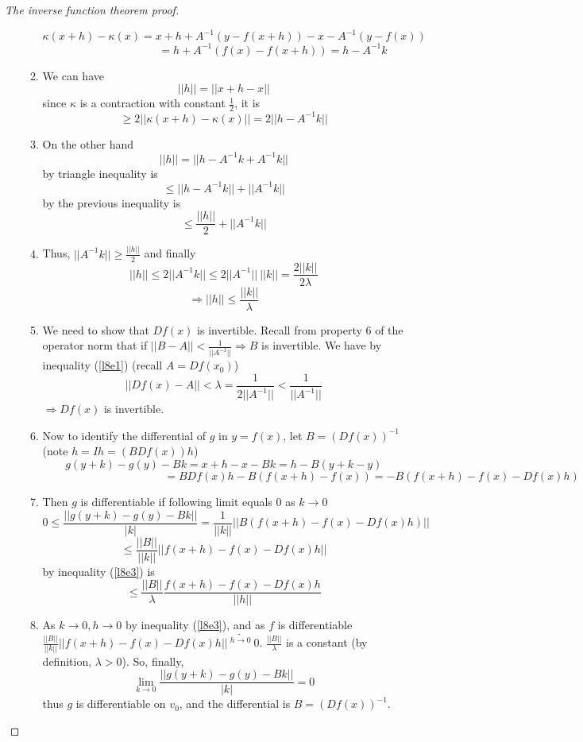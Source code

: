 \begin{proof}[The inverse function theorem proof]
\begin{enumerate}[I]
\begin{enumerate}
      $$\kappa(x+h) - \kappa(x) = x + h + A^{-1}(y-f(x+h))-x-A^{-1}(y-f(x))$$
      $$\phantom{\kappa(x+h) - \kappa(x)} =h+A^{-1}(f(x)-f(x+h))=h-A^{-1}k$$
    \item We can have
      $$||h|| = ||x + h - x||$$
      since $\kappa$ is a contraction with constant $\frac{1}{2}$, it is
      $$\geq 2||\kappa(x+h)-\kappa(x)|| = 2||h-A^{-1}k||$$
    \item On the other hand
      $$||h|| = ||h-A^{-1}k + A^{-1}k||$$
      by triangle inequality is
      $$\leq ||h-A^{-1}k|| + ||A^{-1}k||$$
      by the previous inequality is
      $$\leq \frac{||h||}{2}+||A^{-1}k||$$
    \item Thus, $||A^{-1}k|| \geq \frac{||h||}{2}$ and finally
      $$||h|| \leq 2||A^{-1}k|| \leq 2||A^{-1}||\ ||k|| = \frac{2||k||}{2\lambda}$$
      \begin{equation}
        \label{l8e3}
        \Rightarrow ||h|| \leq \frac{||k||}{\lambda}
      \end{equation}
    \item We need to show that $Df(x)$ is invertible. Recall from property 6 of the operator norm that if $||B - A|| < \frac{1}{||A^{-1}||} \Rightarrow B$ is invertible. We have by inequality (\ref{l8e1}) (recall $A = Df(x_0)$)
      $$||Df(x) - A|| < \lambda = \frac{1}{2||A^{-1}||} < \frac{1}{||A^{-1}||}$$
      $\Rightarrow Df(x)$ is invertible.
    \item Now to identify the differential of $g$ in $y=f(x)$, let $B=(Df(x))^{-1}$ (note $h = Ih = (BDf(x))h$)
      $$g(y+k) - g(y) - Bk = x+h-x-Bk = h-B(y+k-y)$$
      $$\phantom{g(y+k) - g(y) - Bk}= BDf(x)h - B(f(x+h) - f(x)) = -B(f(x+h)-f(x)-Df(x)h)$$
    \item Then $g$ is differentiable if following limit equals $0$ as $k \rightarrow 0$
      $$0 \leq \frac{||g(y+k) - g(y) - Bk||}{|k|} = \frac{1}{||k||}||B(f(x+h)-f(x)-Df(x)h)|| $$
      $$\leq \frac{||B||}{||k||}||f(x+h)-f(x)-Df(x)h||$$
      by inequality (\ref{l8e3}) is
      $$\leq \frac{||B||}{\lambda}\frac{f(x+h)-f(x)-Df(x)h}{||h||}$$
    \item As $k\rightarrow 0, h\rightarrow 0$ by inequality (\ref{l8e3}), and as $f$ is differentiable $\frac{||B||}{||k||}||f(x+h)-f(x)-Df(x)h||\ \underrightarrow{^{h\rightarrow 0}}\ 0$. $\frac{||B||}{\lambda}$ is a constant (by definition, $\lambda > 0$).
      So, finally,
      $$\lim_{k\rightarrow 0}\frac{||g(y+k) - g(y) - Bk||}{|k|} = 0$$
      thus $g$ is differentiable on $v_0$, and the differential is $B = (Df(x))^{-1}$.
    \end{enumerate}
  \end{enumerate}
\end{proof}

